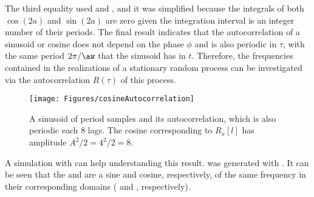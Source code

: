 The third equality used  and , and it was simplified because the integrals of both $\cos(2a)$ and $\sin(2a)$ are zero given the integration interval is an integer number of their periods. The final result indicates that the autocorrelation of a sinusoid or cosine does not depend on the phase $\phi$ and is also periodic in $\tau$, with the same period $2 \pi / \aw$ that the sinusoid has in $t$. Therefore, the frequencies contained in the realizations of a stationary random process can be investigated via the autocorrelation $R(\tau)$ of this process.

\begin{figure}
\centering
\texttt{[image: Figures/cosineAutocorrelation]}
\caption[A sinusoid of period  samples and its autocorrelation, which is also periodic each 8 lags]{A sinusoid of period  samples and its autocorrelation, which is also periodic each 8 lags. The cosine corresponding to $R_x[l]$ has amplitude $A^2/2=4^2/2=8$.\label{fig:cosineAutocorrelation}}
\end{figure}

A simulation with {\matlab} can help understanding this result.
 was generated with .
It can be seen that the  and  are a sine and cosine, respectively, of the same frequency in their corresponding domains ( and , respectively).

